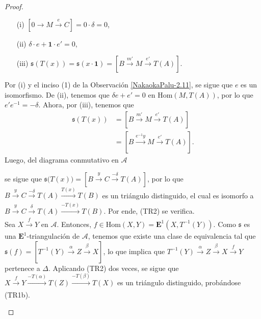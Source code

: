 \documentclass[tesis]{subfiles}
\begin{document}
\begin{proof}
\begin{enumerate}[label=(\alph*)]
\begin{enumerate}
                \item[(i)] $[0\to M\xrightarrow[]{e} C] = 0\cdot\delta = 0$,

                \item[(ii)] $\delta\cdot e + \mathbf{1}\cdot e' = 0$,

                \item[(iii)] $\mathfrak{s}(T(x)) = \mathfrak{s}(x\cdot\mathbf{1}) = [ B\xrightarrow[]{m'} M\xrightarrow[]{e'} T(A) ]$.
            \end{enumerate}
            Por (i) y el inciso (1) de la Observación \ref{NakaokaPalu-2.11}, se sigue que $e$ es un isomorfismo. De (ii), tenemos que $\delta e + e' = 0$ en $\text{Hom}(M,T(A))$, por lo que $e'e^{-1} = -\delta$. Ahora, por (iii), tenemos que
            \begin{align*}
                \mathfrak{s}(T(x)) &= [B\xrightarrow[]{m'}M\xrightarrow[]{e'}T(A)] \\
                               &= [B\xrightarrow[]{e^{-1}y} M\xrightarrow[]{e'} T(A)].
            \end{align*}
            Luego, del diagrama conmutativo en $\mathscr{A}$
            \begin{center}
            \end{center}
            se sigue que $\mathfrak{s}\big(T(x)\big) = [B\xrightarrow[]{y}C\xrightarrow[]{-\delta}T(A)]$, por lo que $B\xrightarrow[]{y}C\xrightarrow[]{-\delta}T(A)\xrightarrow[]{T(x)}T(B)$ es un triángulo distinguido, el cual es isomorfo a $B\xrightarrow[]{y}C\xrightarrow[]{\delta}T(A)\xrightarrow[]{-T(x)}T(B)$. Por ende, (TR2) se verifica. \\

            Sea $X\xrightarrow[]{f}Y$ en $\mathscr{A}$. Entonces, $f\in\text{Hom}(X,Y)= \mathbf{E}^1(X,T^{-1}(Y))$. Como $\mathfrak{s}$ es una $\mathbf{E}^1$-triangulación de $\mathscr{A}$, tenemos que existe una clase de equivalencia tal que $\mathfrak{s}(f) = [T^{-1}(Y)\xrightarrow[]{\alpha}Z\xrightarrow[]{\beta}X]$, lo que implica que $T^{-1}(Y)\xrightarrow[]{\alpha}Z\xrightarrow[]{\beta}X\xrightarrow[]{f}Y$ pertenece a $\Delta$. Aplicando (TR2) dos veces, se sigue que $X\xrightarrow[]{f}Y\xrightarrow[]{-T(\alpha)} T(Z)\xrightarrow[]{-T(\beta)} T(X)$ es un triángulo distinguido, probándose (TR1b). \\


\end{enumerate}
\end{proof}
\end{document}
